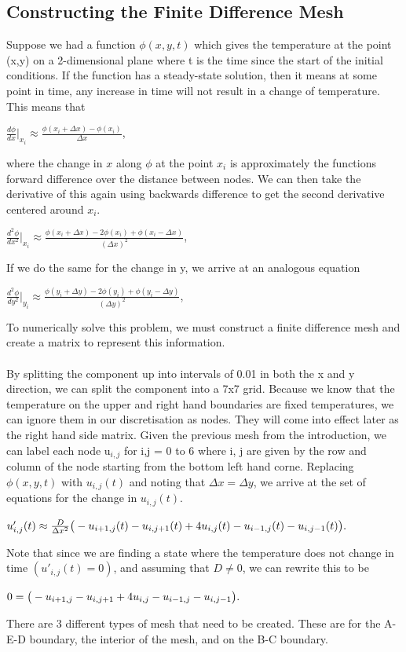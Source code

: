 \documentclass[12pt,a4paper]{article}
\begin{document}
\subsection{Constructing the Finite Difference Mesh}
Suppose we had a function $\phi(x,y,t)$ which gives the temperature at the point (x,y) on a 2-dimensional plane where t is the time since the start of the initial conditions. If the function has a steady-state solution, then it means at some point in time, any increase in time will not result in a change of temperature. This means that 
\begin{center}
$\frac{d\phi}{dx}|_{x_i}\approx\frac{\phi(x_i+\Delta x)-\phi(x_i)}{\Delta x}$,
\end{center}
where the change in $x$ along $\phi$ at the point $x_i$ is approximately the functions forward difference over the distance between nodes. We can then take the derivative of this again using backwards difference to get the second derivative centered around $x_i$.
\begin{center}
$\frac{d^2\phi}{dx^2}|_{x_i}\approx\frac{\phi(x_i+\Delta x)-2\phi(x_i)+\phi(x_i-\Delta x)}{(\Delta x)^2}$,
\end{center}
If we do the same for the change in y, we arrive at an analogous equation
\begin{center}
$\frac{d^2\phi}{dy^2}|_{y_i}\approx\frac{\phi(y_i+\Delta y)-2\phi(y_i)+\phi(y_i-\Delta y)}{(\Delta y)^2}$,
\end{center}
To numerically solve this problem, we must construct a finite difference mesh and create a matrix to represent this information.\\\\
By splitting the component up into intervals of 0.01 in both the x and y direction, we can split the component into a 7x7 grid. Because we know that the temperature on the upper and right hand boundaries are fixed temperatures, we can ignore them in our discretisation as nodes. They will come into effect later as the right hand side matrix. Given the previous mesh from the introduction, we can label each node u$_{i,j}$ for i,j = 0 to 6 where i, j are given by the row and column of the node starting from the bottom left hand corne. Replacing $\phi(x,y,t)$ with $u_{i,j}(t)$ and noting that $\Delta x = \Delta y$, we arrive at the set of equations for the change in $u_{i,j}(t)$.
\begin{center}
$u'_{i,j}(t)\approx\frac{D}{\Delta x^2}\big{(}-u_{i+1,j}(t)-u_{i,j+1}(t)+4u_{i,j}(t)-u_{i-1,j}(t)-u_{i,j-1}(t)\big{)}.$
\end{center}
Note that since we are finding a state where the temperature does not change in time $(u'_{i,j}(t)=0)$, and assuming that $D\neq0$, we can rewrite this to be
\begin{center}
  $0=\big{(}-u_{i+1,j}-u_{i,j+1}+4u_{i,j}-u_{i-1,j}-u_{i,j-1}\big{)}.$
\end{center}
There are 3 different types of mesh that need to be created. These are for the A-E-D boundary, the interior of the mesh, and on the B-C boundary.
\end{document}
